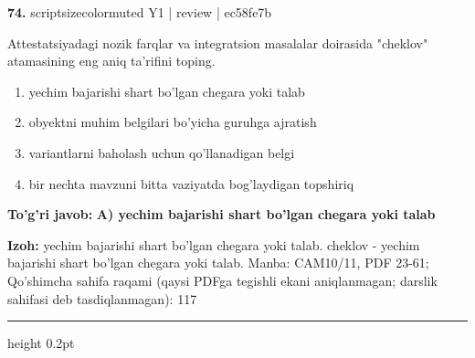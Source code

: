 \documentclass[10pt,a4paper]{article}
\begin{document}
{\bfseries\sffamily\color{ink} 74.} {scriptsizecolor{muted} Y1 | review | ec58fe7b}
\par
Attestatsiyadagi nozik farqlar va integratsion masalalar doirasida "cheklov" atamasining eng aniq ta'rifini toping.
\begin{enumerate}[label=\Alph*),leftmargin=9mm]
\item yechim bajarishi shart bo'lgan chegara yoki talab
\item obyektni muhim belgilari bo'yicha guruhga ajratish
\item variantlarni baholash uchun qo'llanadigan belgi
\item bir nechta mavzuni bitta vaziyatda bog'laydigan topshiriq
\end{enumerate}
\begin{tcolorbox}[enhanced,breakable,colback=teal!4,colframe=teal!60!black,boxrule=0.45pt,arc=1.2mm,left=2.7mm,right=2.7mm,top=1.8mm,bottom=1.8mm,before skip=2mm,after skip=2mm]
{\bfseries\sffamily\color{teal}To'g'ri javob:} \textbf{A) yechim bajarishi shart bo'lgan chegara yoki talab}
\par\smallskip
{\bfseries Izoh:} yechim bajarishi shart bo'lgan chegara yoki talab. cheklov - yechim bajarishi shart bo'lgan chegara yoki talab. Manba: CAM10/11, PDF 23-61; Qo'shimcha sahifa raqami (qaysi PDFga tegishli ekani aniqlanmagan; darslik sahifasi deb tasdiqlanmagan): 117
\end{tcolorbox}
\vspace{2mm}\hrule height 0.2pt\vspace{3mm}
\end{document}
